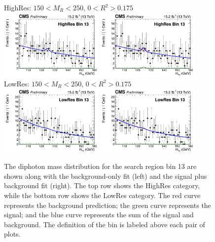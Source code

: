 \begin{figure}[ht!]
\centering
HighRes: $150 < M_{R} < 250$\GeV, $0 < R^{2}>0.175$\\
\includegraphics[width=0.45\textwidth, angle=0.]{figs/unblindedResults2p3Plus12p9/highResBin13_fit_b.png}
\includegraphics[width=0.45\textwidth, angle=0.]{figs/unblindedResults2p3Plus12p9/highResBin13_fit_s.png}\\
LowRes: $150 < M_{R} < 250$\GeV, $0 < R^{2}>0.175$\\
\includegraphics[width=0.45\textwidth, angle=0.]{figs/unblindedResults2p3Plus12p9/lowResBin13_fit_b.png}
\includegraphics[width=0.45\textwidth, angle=0.]{figs/unblindedResults2p3Plus12p9/lowResBin13_fit_s.png}\\
\caption{ The diphoton mass distribution for the search region bin 13 
are shown along with the background-only fit (left) and the signal plus background fit (right).
The top row shows the HighRes category, while the bottom row shows the LowRes category.
The red curve represents the background prediction; the green curve represents the signal; 
and the blue curve represents the sum of the signal and background. The definition of the bin
is labeled above each pair of plots.
\label{fig:UnblindedResultsBin13}}
\end{figure}

